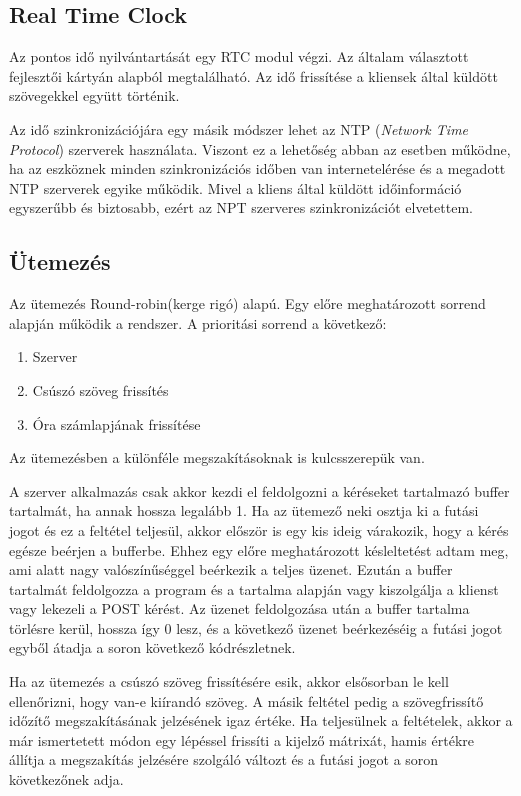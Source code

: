\documentclass[a4paper, 12pt]{article}
\begin{document}
\subsection{Real Time Clock}
Az pontos idő nyilvántartását egy RTC modul végzi. Az általam választott fejlesztői kártyán alapból megtalálható.
Az idő frissítése a kliensek által küldött szövegekkel együtt történik.

Az idő szinkronizációjára egy másik módszer lehet az NTP (\textit{Network Time Protocol}) szerverek használata. Viszont ez a lehetőség abban az esetben működne, ha az eszköznek minden szinkronizációs időben van internetelérése és a megadott NTP szerverek egyike működik.
Mivel a kliens által küldött időinformáció egyszerűbb és biztosabb, ezért az NPT szerveres szinkronizációt elvetettem.

\subsection{Ütemezés}
Az ütemezés Round-robin(kerge rigó) alapú. Egy előre meghatározott sorrend alapján működik a rendszer. A prioritási sorrend a következő:
\begin{enumerate}
	\item Szerver
	\item Csúszó szöveg frissítés
	\item Óra számlapjának frissítése
\end{enumerate}
Az ütemezésben a különféle megszakításoknak is kulcsszerepük van.

A szerver alkalmazás csak akkor kezdi el feldolgozni a kéréseket tartalmazó buffer tartalmát, ha annak hossza legalább 1. Ha az ütemező neki osztja ki a futási jogot és ez a feltétel teljesül, akkor először is egy kis ideig várakozik, hogy a kérés egésze beérjen a bufferbe. Ehhez egy előre meghatározott késleltetést adtam meg, ami alatt nagy valószínűséggel beérkezik a teljes üzenet. Ezután a buffer tartalmát feldolgozza a program és a tartalma alapján vagy kiszolgálja a klienst vagy lekezeli a POST kérést. Az üzenet feldolgozása után a buffer tartalma törlésre kerül, hossza így 0 lesz, és a következő üzenet beérkezéséig a futási jogot egyből átadja a soron következő kódrészletnek.

Ha az ütemezés a csúszó szöveg frissítésére esik, akkor elsősorban le kell ellenőrizni, hogy van-e kiírandó szöveg. A másik feltétel pedig a szövegfrissítő időzítő megszakításának jelzésének igaz értéke. Ha teljesülnek a feltételek, akkor a már ismertetett módon egy lépéssel frissíti a kijelző mátrixát, hamis értékre állítja a megszakítás jelzésére szolgáló változt és a futási jogot a soron következőnek adja.
\end{document}
